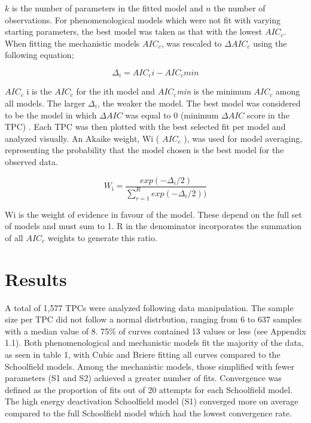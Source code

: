 \documentclass[12pt]{article}
\begin{document}
\begin{linenumbers}
\(k\) is the number of parameters in the fitted model and \(n\) the number of observations. For phenomenological models which were not fit with varying starting parameters, the best model was taken as that with the lowest \(AIC_c\). When fitting the mechanistic models \(AIC_c\), was rescaled to \(\Delta AIC_c\) using the following equation;

\begin{equation}
\Delta_i = AIC_c i - AIC_c min \tag{8}
\end{equation}


\( AIC_c \) \textunderscore i is the \(AIC_c\) for the ith model and \(AIC_c\)\textit{min} is the minimum \(AIC_c\) among all models. The larger \(\Delta_i\), the weaker the model. The best model was considered to be the model in which \(\Delta AIC\) was equal to 0 (minimum \(\Delta AIC\) score in the TPC) \cite{article3}. Each TPC was then plotted with the best selected fit per model and analyzed visually. An Akaike weight, W\textunderscore i ( \(AIC_c\) ), was used for model averaging, representing the probability that the model chosen is the best model for the observed data.

\begin{equation}
W_{\text{i}} = \frac{exp(-\Delta_i/2)}{\sum_{r = 1}^{R} exp(-\Delta_i/2))}\tag{9}
\end{equation}

W\textunderscore i is the weight of evidence in favour of the model. These depend on the full set of models and must sum to 1. R in the denominator incorporates the summation of all \(AIC_c\) weights to generate this ratio.

\section{Results}
A total of 1,577 TPCs were analyzed following data manipulation. The sample size per TPC did not follow a normal distrbution, ranging from 6 to 637 samples with a median value of 8. 75\% of curves contained 13 values or less (see Appendix 1.1). Both phenomenological and mechanistic models fit the majority of the data, as seen in table 1, with Cubic and Briere fitting all curves compared to the Schoolfield models. Among the mechanistic models, those simplified with fewer parameters (S1 and S2) achieved a greater number of fits. Convergence was defined as the proportion of fits out of 20 attempts for each Schoolfield model. The high energy deactivation Schoolfield model (S1) converged more on average compared to the full Schoolfield model which had the lowest convergence rate.\\


\end{linenumbers}
\end{document}
